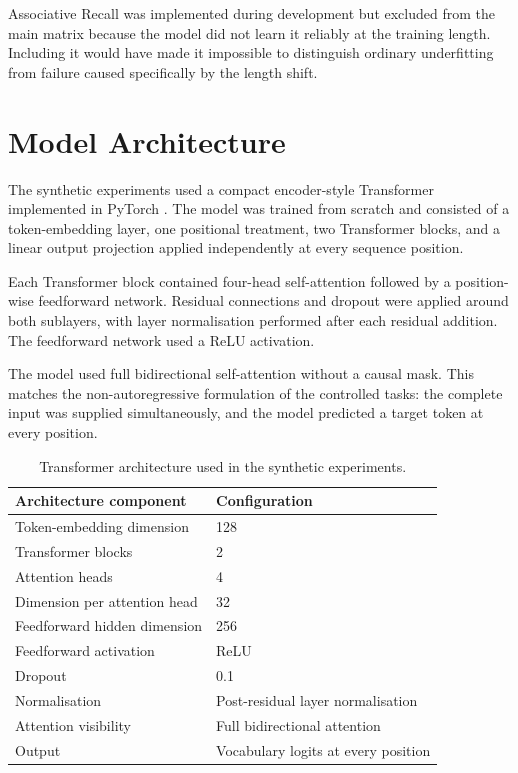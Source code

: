 \documentclass[
    author={Aanchala Ravindra Bhongade},
    supervisor={Dr. Fernando Moreno-Pino},
    degree={MSc},
    title={Length Generalisation in Transformer-Based Sequence Models: Failure Taxonomy and Mitigation Strategies},
    subtitle={},
    type={},
    year={2026}
]{dissertation}
\begin{document}
Associative Recall was implemented during development but excluded from the main matrix because the model did not learn it reliably at the training length. Including it would have made it impossible to distinguish ordinary underfitting from failure caused specifically by the length shift.

\section{Model Architecture}
\label{sec:model-architecture}

The synthetic experiments used a compact encoder-style Transformer
implemented in PyTorch \cite{paszke2019pytorch}. The model was trained from scratch and consisted of a token-embedding layer, one positional treatment, two Transformer blocks, and a linear output projection applied independently at every sequence position.

Each Transformer block contained four-head self-attention followed by a position-wise feedforward network. Residual connections and dropout were applied around both sublayers, with layer normalisation performed after each residual addition. The feedforward network used a ReLU activation.

The model used full bidirectional self-attention without a causal mask. This matches the non-autoregressive formulation of the controlled tasks: the complete input was supplied simultaneously, and the model predicted a target token at every position.

\begin{table}[tbp]
\centering
\small
\renewcommand{\arraystretch}{1.15}
\begin{tabular}{
    p{}
    p{}
}
\hline
\textbf{Architecture component} & \textbf{Configuration} \\
\hline
Token-embedding dimension & 128 \\
Transformer blocks & 2 \\
Attention heads & 4 \\
Dimension per attention head & 32 \\
Feedforward hidden dimension & 256 \\
Feedforward activation & ReLU \\
Dropout & 0.1 \\
Normalisation & Post-residual layer normalisation \\
Attention visibility & Full bidirectional attention \\
Output & Vocabulary logits at every position \\
\hline
\end{tabular}
\caption{Transformer architecture used in the synthetic experiments.}
\label{tab:model-config}
\end{table}
\end{document}
